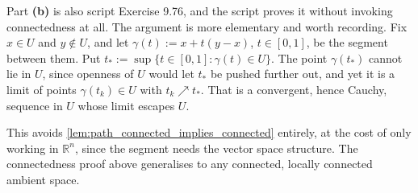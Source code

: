 \begin{remark}
Part \textbf{(b)} is also script Exercise 9.76, and the script proves it without invoking
connectedness at all. The argument is more elementary and worth recording. Fix $x \in U$ and
$y \notin U$, and let $\gamma(t) := x+t(y-x)$, $t\in[0,1]$, be the segment between them. Put
$t_* := \sup\{t\in[0,1] : \gamma(t)\in U\}$. The point $\gamma(t_*)$ cannot lie in $U$, since
openness of $U$ would let $t_*$ be pushed further out, and yet it is a limit of points
$\gamma(t_k) \in U$ with $t_k \nearrow t_*$. That is a convergent, hence Cauchy, sequence in $U$
whose limit escapes $U$.

This avoids \cref{lem:path_connected_implies_connected} entirely, at the cost of only working in
$\mathbb{R}^n$, since the segment needs the vector space structure. The connectedness proof above
generalises to any connected, locally connected ambient space.
\end{remark}

